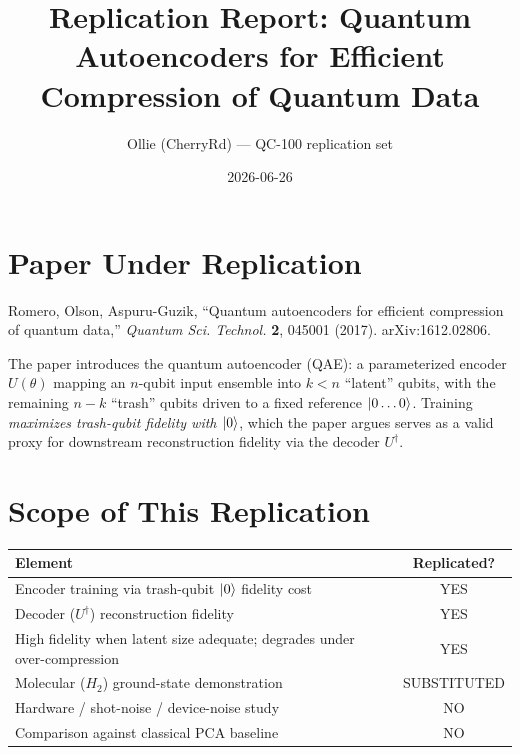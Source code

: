 \documentclass[11pt]{article}
\title{Replication Report: Quantum Autoencoders for Efficient Compression of Quantum Data}
\author{Ollie (CherryRd) --- QC-100 replication set}
\date{2026-06-26}
\begin{document}
\maketitle

\section{Paper Under Replication}
Romero, Olson, Aspuru-Guzik, ``Quantum autoencoders for efficient compression of
quantum data,'' \emph{Quantum Sci. Technol.} \textbf{2}, 045001 (2017).
arXiv:1612.02806.

The paper introduces the quantum autoencoder (QAE): a parameterized encoder
$U(\theta)$ mapping an $n$-qubit input ensemble into $k < n$ ``latent'' qubits,
with the remaining $n-k$ ``trash'' qubits driven to a fixed reference
$\ket{0\dots0}$. Training \emph{maximizes trash-qubit fidelity with $\ket{0}$},
which the paper argues serves as a valid proxy for downstream reconstruction
fidelity via the decoder $U^\dagger$.

\section{Scope of This Replication}
\begin{tabular}{lc}
\toprule
Element & Replicated? \\
\midrule
Encoder training via trash-qubit $\ket{0}$ fidelity cost & YES \\
Decoder ($U^\dagger$) reconstruction fidelity & YES \\
High fidelity when latent size adequate; degrades under over-compression & YES \\
Molecular ($H_2$) ground-state demonstration & SUBSTITUTED \\
Hardware / shot-noise / device-noise study & NO \\
Comparison against classical PCA baseline & NO \\
\bottomrule
\end{tabular}
\end{document}
